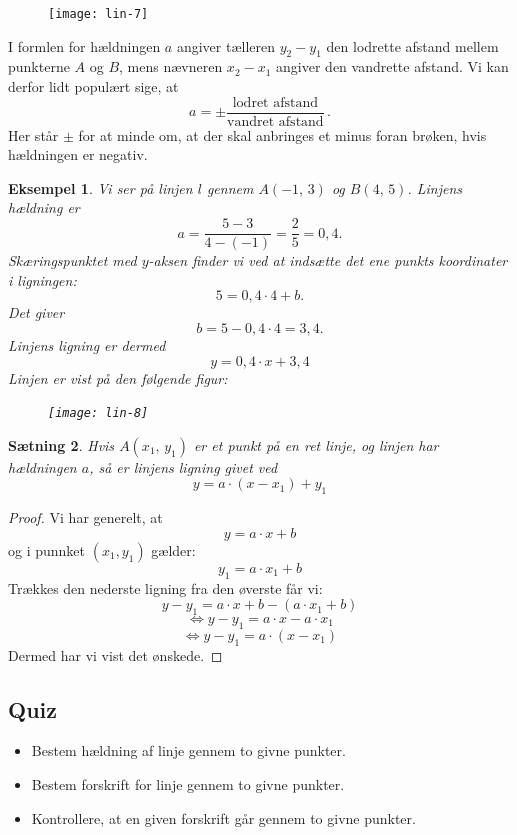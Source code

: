 \documentclass[12pt,oneside,a4paper]{article}
\newtheorem{thm}{Sætning}[section]
\newtheorem{eks}[thm]{Eksempel}
\begin{document}
\begin{figure}[H]
    \centering
    \texttt{[image: lin-7]}
    \caption{}
    \label{linear-2}
\end{figure}

I formlen for hældningen $a$ angiver tælleren $y_2-y_1$ den lodrette afstand
mellem punkterne $A$ og $B$, mens nævneren $x_2-x_1$ angiver den vandrette
afstand. Vi kan derfor lidt populært sige, at
\[
a = \pm \frac{\mbox{lodret afstand}}{\mbox{vandret afstand}} \,.
\]
Her står $\pm$ for at minde om, at der skal anbringes et minus foran brøken,
hvis hældningen er negativ.
\begin{tcolorbox}
\begin{eks}
    Vi ser på linjen $l$ gennem $A(-1,\,3)$ og $B(4,\,5)$.
    Linjens hældning er
    $$
    a = \frac{5-3}{4-(-1)} = \frac{2}{5} = 0,4.
    $$
    Skæringspunktet med $y$-aksen finder vi ved at indsætte det ene punkts
    koordinater i ligningen:
    $$
    5 = 0,4\cdot 4 + b.
    $$
    Det giver
    $$
    b = 5 - 0,4\cdot 4 = 3,4.
    $$
    Linjens ligning er dermed
    $$
    y = 0,4 \cdot x + 3,4 
    $$
    Linjen er vist på den følgende figur:
\begin{figure}[H]
    \centering
    \texttt{[image: lin-8]}
    \caption{}
    \label{linear-3}
\end{figure}
\end{eks}
\end{tcolorbox}

\begin{tcolorbox}
\begin{thm}
    Hvis $A(x_1,\,y_1)$ er et punkt på en ret linje, og linjen har hældningen
    $a$, så er linjens ligning givet ved
    $$
    y = a\cdot (x-x_1) + y_1 
    $$
\end{thm}
\end{tcolorbox}
\begin{proof}
    Vi har generelt, at 
    $$
    y = a\cdot x + b
    $$
    og i punnket $(x_1, y_1)$ gælder:
    $$
    y_1 = a\cdot x_1 + b
    $$
    Trækkes den nederste ligning fra den øverste får vi:
    $$
    y-y_1 = a \cdot x + b - (a \cdot x_1 + b)
    $$
    $$
    \Leftrightarrow y-y_1 = a \cdot x - a \cdot x_1
    $$
    $$
    \Leftrightarrow y-y_1 = a \cdot (x - x_1)
    $$
    Dermed har vi vist det ønskede.
\end{proof}

\subsection{Quiz}
\begin{itemize}
    \item Bestem hældning af linje gennem to givne punkter.
    \item Bestem forskrift for linje gennem to givne punkter.
    \item Kontrollere, at en given forskrift går gennem to givne punkter.
\end{itemize}
\end{document}

